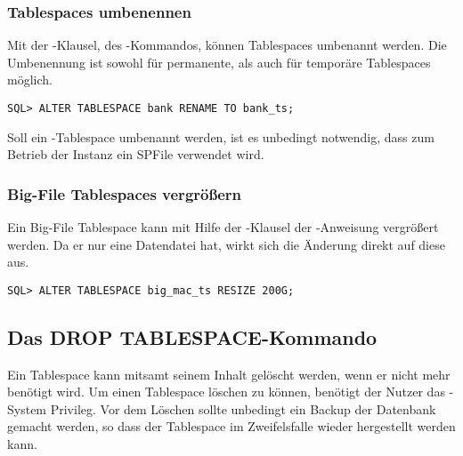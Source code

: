         \subsubsection{Tablespaces umbenennen}
          Mit der -Klausel, des -Kommandos, können Tablespaces umbenannt werden. Die Umbenennung ist sowohl für permanente, als auch für temporäre Tablespaces möglich.
          \begin{lstlisting}[caption={Einen Tablespace umbenennen},label=admin116,language=oracle_sql]
SQL> ALTER TABLESPACE bank RENAME TO bank_ts;
          \end{lstlisting}
          \begin{merke}
            Soll ein -Tablespace umbenannt werden, ist es unbedingt notwendig, dass zum Betrieb der Instanz ein SPFile verwendet wird.
          \end{merke}
        \subsubsection{Big-File Tablespaces vergrößern}
          Ein Big-File Tablespace kann mit Hilfe der -Klausel der -An\-wei\-sung vergrößert werden. Da er nur eine Datendatei hat, wirkt sich die Änderung direkt auf diese aus.
          \begin{lstlisting}[caption={Einen Big-File Tablespace vergrößern},label=admin117,language=oracle_sql]
SQL> ALTER TABLESPACE big_mac_ts RESIZE 200G;
          \end{lstlisting}
      \subsection{Das DROP TABLESPACE-Kommando}
          Ein Tablespace kann mitsamt seinem Inhalt gelöscht werden, wenn er nicht mehr benötigt wird. Um einen Tablespace löschen zu können, benötigt der Nutzer das -System Privileg. Vor dem Löschen sollte unbedingt ein Backup der Datenbank gemacht werden, so dass der Tablespace im Zweifelsfalle wieder hergestellt werden kann.

